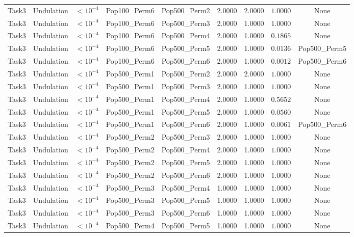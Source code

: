 \documentclass[8pt]{article}
\begin{document}
\begin{longtable}{llccccccc}
Task3 & Undulation & $< 10^{-4}$ & Pop100\_Perm6 & Pop500\_Perm2 & 2.0000 & 2.0000 & $1.0000$ & None \\
Task3 & Undulation & $< 10^{-4}$ & Pop100\_Perm6 & Pop500\_Perm3 & 2.0000 & 1.0000 & $1.0000$ & None \\
Task3 & Undulation & $< 10^{-4}$ & Pop100\_Perm6 & Pop500\_Perm4 & 2.0000 & 1.0000 & $0.1865$ & None \\
Task3 & Undulation & $< 10^{-4}$ & Pop100\_Perm6 & Pop500\_Perm5 & 2.0000 & 1.0000 & $0.0136$ & Pop500\_Perm5 \\
Task3 & Undulation & $< 10^{-4}$ & Pop100\_Perm6 & Pop500\_Perm6 & 2.0000 & 1.0000 & $0.0012$ & Pop500\_Perm6 \\
Task3 & Undulation & $< 10^{-4}$ & Pop500\_Perm1 & Pop500\_Perm2 & 2.0000 & 2.0000 & $1.0000$ & None \\
Task3 & Undulation & $< 10^{-4}$ & Pop500\_Perm1 & Pop500\_Perm3 & 2.0000 & 1.0000 & $1.0000$ & None \\
Task3 & Undulation & $< 10^{-4}$ & Pop500\_Perm1 & Pop500\_Perm4 & 2.0000 & 1.0000 & $0.5652$ & None \\
Task3 & Undulation & $< 10^{-4}$ & Pop500\_Perm1 & Pop500\_Perm5 & 2.0000 & 1.0000 & $0.0560$ & None \\
Task3 & Undulation & $< 10^{-4}$ & Pop500\_Perm1 & Pop500\_Perm6 & 2.0000 & 1.0000 & $0.0061$ & Pop500\_Perm6 \\
Task3 & Undulation & $< 10^{-4}$ & Pop500\_Perm2 & Pop500\_Perm3 & 2.0000 & 1.0000 & $1.0000$ & None \\
Task3 & Undulation & $< 10^{-4}$ & Pop500\_Perm2 & Pop500\_Perm4 & 2.0000 & 1.0000 & $1.0000$ & None \\
Task3 & Undulation & $< 10^{-4}$ & Pop500\_Perm2 & Pop500\_Perm5 & 2.0000 & 1.0000 & $1.0000$ & None \\
Task3 & Undulation & $< 10^{-4}$ & Pop500\_Perm2 & Pop500\_Perm6 & 2.0000 & 1.0000 & $1.0000$ & None \\
Task3 & Undulation & $< 10^{-4}$ & Pop500\_Perm3 & Pop500\_Perm4 & 1.0000 & 1.0000 & $1.0000$ & None \\
Task3 & Undulation & $< 10^{-4}$ & Pop500\_Perm3 & Pop500\_Perm5 & 1.0000 & 1.0000 & $1.0000$ & None \\
Task3 & Undulation & $< 10^{-4}$ & Pop500\_Perm3 & Pop500\_Perm6 & 1.0000 & 1.0000 & $1.0000$ & None \\
Task3 & Undulation & $< 10^{-4}$ & Pop500\_Perm4 & Pop500\_Perm5 & 1.0000 & 1.0000 & $1.0000$ & None \\

\end{longtable}
\end{document}
